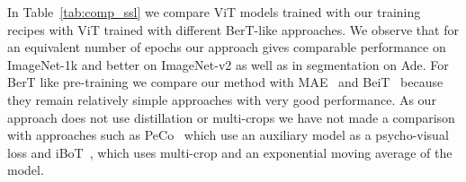 In Table~\ref{tab:comp_ssl} we compare ViT models trained with our training recipes with ViT trained with different BerT-like approaches. We observe that for an equivalent number of epochs our approach gives comparable performance on ImageNet-1k and better on ImageNet-v2 as well as in segmentation on Ade. For BerT like pre-training we compare our method with MAE~\cite{He2021MaskedAA} and BeiT~\cite{bao2021beit} because they remain  relatively simple approaches with very good performance. As our approach does not use distillation or multi-crops we have not made a comparison with approaches such as PeCo~\cite{Dong2021PeCoPC} which use an auxiliary model as a psycho-visual loss and iBoT~\cite{Zhou2021iBOTIB}, which uses multi-crop and an exponential moving average of the model.
\begin{table}[t]
    \centering
\end{table}
